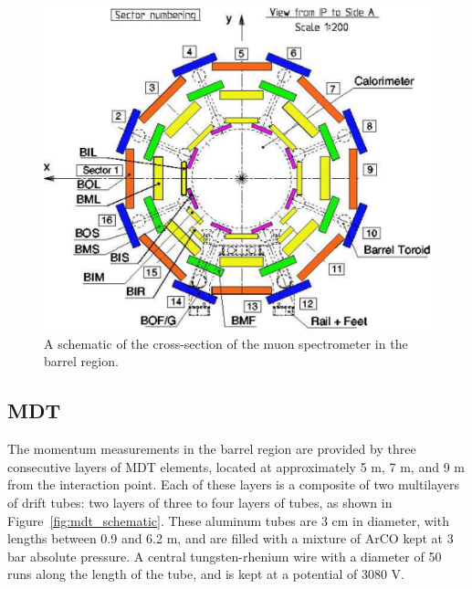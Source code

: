 \begin{figure}[hbtp]
\includegraphics[width=\fullfig]{figures/muon_barrel_schematic.pdf}
\caption{A schematic of the cross-section of the muon spectrometer in the barrel region.}
\label{fig:muon_barrel_schematic}
\end{figure}


\subsection{\acl{MDT}}
\label{sec:mdt}
The momentum measurements in the barrel region are provided by three consecutive layers of \ac{MDT} elements, located at approximately 5 m, 7 m, and 9 m from the interaction point.
Each of these layers is a composite of two multilayers of drift tubes: two layers of three to four layers of tubes, as shown in Figure~\ref{fig:mdt_schematic}.
These aluminum tubes are 3 cm in diameter, with lengths between 0.9 and 6.2 m, and are filled with a mixture of ArCO kept at 3 bar absolute pressure.
A central tungsten-rhenium wire with a diameter of 50 \um runs along the length of the tube, and is kept at a potential of 3080 V.

